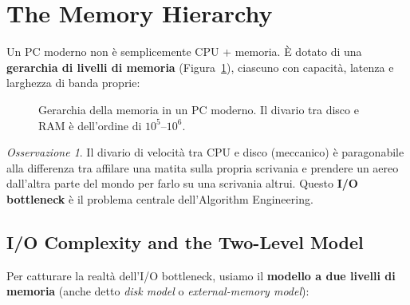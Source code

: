 \documentclass[12pt, a4paper, oneside]{book}
\theoremstyle{plain}
\theoremstyle{definition}
\theoremstyle{remark}
\newtheorem{osservazione}[teorema]{Osservazione}
\begin{document}
\section{The Memory Hierarchy}

Un PC moderno non è semplicemente CPU + memoria. È dotato di una \textbf{gerarchia di livelli di memoria} (Figura~\ref{fig:hierarchy}), ciascuno con capacità, latenza e larghezza di banda proprie:

\begin{figure}[H]
\centering
{}
\caption{Gerarchia della memoria in un PC moderno. Il divario tra disco e RAM è dell'ordine di $10^5$--$10^6$.}
\label{fig:hierarchy}
\end{figure}

\begin{osservazione}
Il divario di velocità tra CPU e disco (meccanico) è paragonabile alla differenza tra affilare una matita sulla propria scrivania e prendere un aereo dall'altra parte del mondo per farlo su una scrivania altrui. Questo \textbf{I/O bottleneck} è il problema centrale dell'Algorithm Engineering.
\end{osservazione}

\subsection{I/O Complexity and the Two-Level Model}

Per catturare la realtà dell'I/O bottleneck, usiamo il \textbf{modello a due livelli di memoria} (anche detto \emph{disk model} o \emph{external-memory model}):
\end{document}

